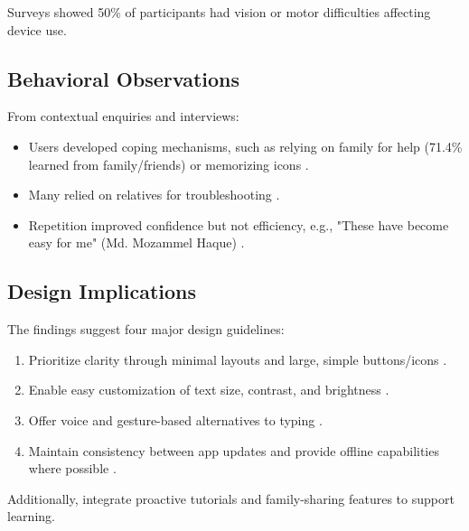 \documentclass[acmlarge]{acmart}
\begin{document}
Surveys showed 50\% of participants had vision or motor difficulties affecting device use.

\subsection{Behavioral Observations}
From contextual enquiries and interviews:
\begin{itemize}
    \item Users developed coping mechanisms, such as relying on family for help (71.4\% learned from family/friends) or memorizing icons \cite{brown2022contextual}.
    \item Many relied on relatives for troubleshooting \cite{rodriguez2018oldertech}.
    \item Repetition improved confidence but not efficiency, e.g., "These have become easy for me" (Md. Mozammel Haque) \cite{lee2021gerontech}.
\end{itemize}

\subsection{Design Implications}
The findings suggest four major design guidelines:
\begin{enumerate}
    \item Prioritize clarity through minimal layouts and large, simple buttons/icons \cite{norman2016accessible}.
    \item Enable easy customization of text size, contrast, and brightness \cite{chang2023smartaging}.
    \item Offer voice and gesture-based alternatives to typing \cite{zhao2020voiceassist}.
    \item Maintain consistency between app updates and provide offline capabilities where possible \cite{peacock2020elderlyusage}.
\end{enumerate}

Additionally, integrate proactive tutorials and family-sharing features to support learning.
\end{document}

